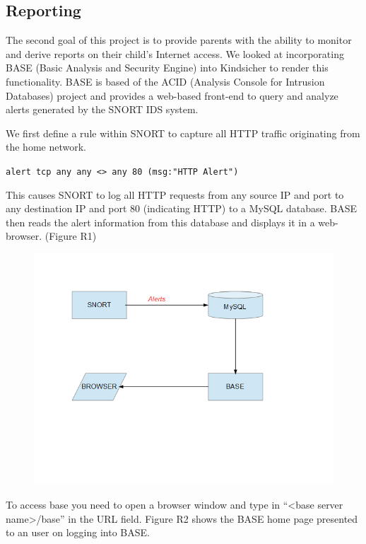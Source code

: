 \subsection{Reporting}

The second goal of this project is to provide parents with the ability to
monitor and derive reports on their child's Internet access. 
%
We looked at incorporating BASE (Basic Analysis and Security Engine) into Kindsicher to
render this functionality. 
%
BASE is based of the ACID (Analysis Console for Intrusion Databases) project
and provides a web-based front-end to query and analyze alerts generated by
the SNORT IDS system.

We first define a rule within SNORT to capture all HTTP traffic originating
from the home network.  

\verb+alert tcp any any <> any 80 (msg:"HTTP Alert")+ 

This causes SNORT to log all HTTP requests from any source IP and port to any
destination IP and port 80 (indicating HTTP) to a MySQL database. 
%
BASE then reads the alert information from this database and displays it in a
web-browser. (Figure R1)

\begin{figure}
\includegraphics{figures/R1_BASE_Flow}
\end{figure}

To access base you need to open a browser window and type in “<base server
name>/base” in the URL field.
%
Figure R2 shows the BASE home page presented to an user on logging into BASE.

